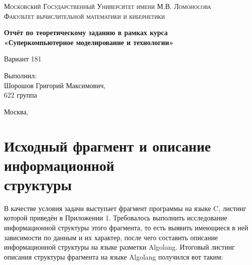 \documentclass[oneside, final, 14pt]{extarticle}
\begin{document}
\normalsize

\begin{titlepage}
\begin{center}
\textsc{Московский Государственный Университет имени М.В. Ломоносова\\[5mm]
Факультет вычислительной математики и кибернетики}
\centerline{\hfill\hrulefill\hrulefill\hfill}
\end{center}

\vfill
\vfill
\vfill
\vfill
\begin{center}
\Large
\textbf{Отчёт по теоретическому заданию в рамках курса \\
«Суперкомпьютерное моделирование и технологии»}
\end{center}

\vfill
\vfill
\vfill
\hfill
\begin{flushright}
Вариант 181
\end{flushright}
    
\begin{flushright}
Выполнил: \\
Шорошов Григорий Максимович, \\
622 группа \\[5mm]
\end{flushright}

\vfill
\vfill
\vfill
\begin{center}
Москва, \the\year
\end{center}
\end{titlepage}
 
\parindent=1cm

\newpage
\section*{Исходный фрагмент и описание информационной \\ структуры}
В качестве условия задачи выступает фрагмент программы на языке C, листинг которой приведён
в Приложении 1. Требовалось выполнить исследование информационной структуры этого
фрагмента, то есть выявить имеющиеся в ней зависимости по данным и их характер, после чего
составить описание информационной структуры на языке разметки Algolang. Итоговый листинг
описания структуры фрагмента на языке Algolang получился вот таким:
\end{document}
